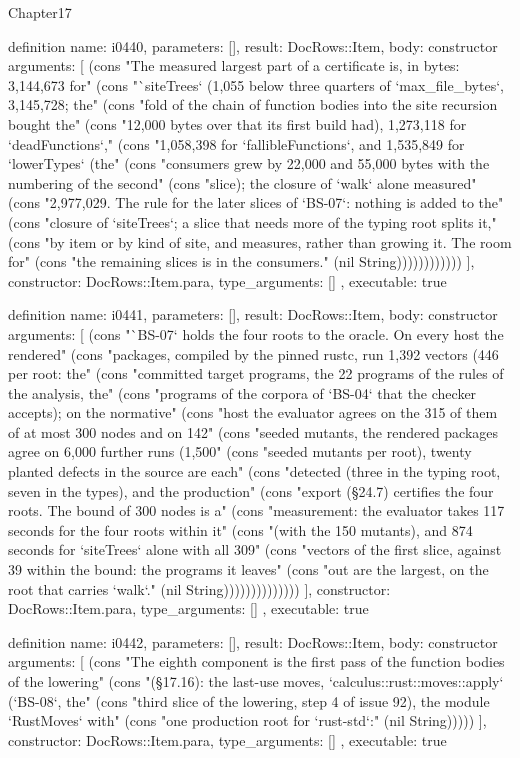 \begin{lexlean}{Chapter17}
\begin{semanticmodule}
definition{
  name: i0440,
  parameters: [],
  result: DocRows::Item,
  body: constructor{
    arguments: [
      (cons "The measured largest part of a certificate is, in bytes: 3,144,673 for" (cons "`siteTrees` (1,055 below three quarters of `max_file_bytes`, 3,145,728; the" (cons "fold of the chain of function bodies into the site recursion bought the" (cons "12,000 bytes over that its first build had), 1,273,118 for `deadFunctions`," (cons "1,058,398 for `fallibleFunctions`, and 1,535,849 for `lowerTypes` (the" (cons "consumers grew by 22,000 and 55,000 bytes with the numbering of the second" (cons "slice); the closure of `walk` alone measured" (cons "2,977,029. The rule for the later slices of `BS-07`: nothing is added to the" (cons "closure of `siteTrees`; a slice that needs more of the typing root splits it," (cons "by item or by kind of site, and measures, rather than growing it. The room for" (cons "the remaining slices is in the consumers." (nil String))))))))))))
    ],
    constructor: DocRows::Item.para,
    type_arguments: []
  },
  executable: true
}

definition{
  name: i0441,
  parameters: [],
  result: DocRows::Item,
  body: constructor{
    arguments: [
      (cons "`BS-07` holds the four roots to the oracle. On every host the rendered" (cons "packages, compiled by the pinned rustc, run 1,392 vectors (446 per root: the" (cons "committed target programs, the 22 programs of the rules of the analysis, the" (cons "programs of the corpora of `BS-04` that the checker accepts); on the normative" (cons "host the evaluator agrees on the 315 of them of at most 300 nodes and on 142" (cons "seeded mutants, the rendered packages agree on 6,000 further runs (1,500" (cons "seeded mutants per root), twenty planted defects in the source are each" (cons "detected (three in the typing root, seven in the types), and the production" (cons "export (§24.7) certifies the four roots. The bound of 300 nodes is a" (cons "measurement: the evaluator takes 117 seconds for the four roots within it" (cons "(with the 150 mutants), and 874 seconds for `siteTrees` alone with all 309" (cons "vectors of the first slice, against 39 within the bound: the programs it leaves" (cons "out are the largest, on the root that carries `walk`." (nil String))))))))))))))
    ],
    constructor: DocRows::Item.para,
    type_arguments: []
  },
  executable: true
}

definition{
  name: i0442,
  parameters: [],
  result: DocRows::Item,
  body: constructor{
    arguments: [
      (cons "The eighth component is the first pass of the function bodies of the lowering" (cons "(§17.16): the last-use moves, `calculus::rust::moves::apply` (`BS-08`, the" (cons "third slice of the lowering, step 4 of issue 92), the module `RustMoves` with" (cons "one production root for `rust-std`:" (nil String)))))
    ],
    constructor: DocRows::Item.para,
    type_arguments: []
  },
  executable: true
}


\end{semanticmodule}
\end{lexlean}

